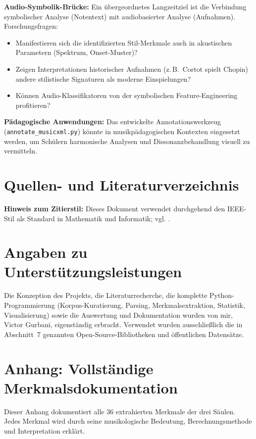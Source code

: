 \documentclass[12pt,a4paper]{article}
\theoremstyle{definition}
\begin{document}
\textbf{Audio-Symbolik-Brücke:}
Ein übergeordnetes Langzeitziel ist die Verbindung symbolischer Analyse (Notentext) mit audioba\-sierter Analyse (Aufnahmen). Forschungsfragen:
\begin{itemize}
    \item Manifestieren sich die identifizierten Stil-Merkmale auch in akustischen Parametern (Spektrum, Onset-Muster)?
    \item Zeigen Interpretationen historischer Aufnahmen (z.\,B.\ Cortot spielt Chopin) andere stilistische Signaturen als moderne Einspielungen?
    \item Können Audio-Klassifikatoren von der symbolischen Feature-Engineering profitieren?
\end{itemize}

\textbf{Pädagogische Anwendungen:}
Das entwickelte Annotationswerkzeug (\texttt{annotate\_musicxml.py}) könnte in musikpädagogischen Kontexten eingesetzt werden, um Schülern harmonische Analysen und Dissonanzbehandlung visuell zu vermitteln.

\clearpage
\hypersetup{pageanchor=false}
\section{Quellen- und Literaturverzeichnis}
\textbf{Hinweis zum Zitierstil:} Dieses Dokument verwendet durchgehend den IEEE-Stil als Standard in Mathematik und Informatik; vgl. \cite{IEEEStyle}.
\printbibliography[heading=none]

\section*{Angaben zu Unterstützungsleistungen}
Die Konzeption des Projekts, die Literaturrecherche, die komplette Python-Programmierung (Korpus-Kuratierung, Parsing, Merkmalsextraktion, Statistik, Visualisierung) sowie die Auswertung und Dokumentation wurden von mir, Victor Gurbani, eigenständig erbracht. Verwendet wurden ausschließlich die in Abschnitt~7 genannten Open-Source-Bibliotheken und öffentlichen Datensätze. 

\newpage
{}
\hypersetup{pageanchor=true}
\setcounter{page}{1}
\appendix
\section{Anhang: Vollständige Merkmalsdokumentation}

Dieser Anhang dokumentiert alle 36 extrahierten Merkmale der drei Säulen. Jedes Merkmal wird durch seine musikologische Bedeutung, Berechnungsmethode und Interpretation erklärt.
\end{document}
